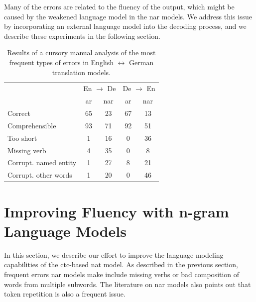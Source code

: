Many of the errors are related to the fluency of the output, which might be
caused by the weakened language model in the \ac{nar} models. We address this
issue by incorporating an external language model into the decoding process,
and we describe these experiments in the following section.

\begin{table}
  \centering
  \begin{tabular}{lcccc}
    \toprule
    & \multicolumn{2}{c}{En $\rightarrow$ De} & \multicolumn{2}{c}{De $\rightarrow$ En} \\
    & \acs{ar} & \acs{nar} & \acs{ar} & \acs{nar} \\
    \midrule
    Correct        & 65 & 23 & 67 & 13 \\
    Comprehensible & 93 & 71 & 92 & 51 \\
    \midrule
    Too short      & 1 & 16 & 0 & 36 \\
    Missing verb   & 4 & 35 & 0 & 8 \\
    Corrupt. named entity   & 1 & 27 & 8 & 21 \\
    Corrupt. other words & 1 & 20 & 0 & 46 \\
    \bottomrule
  \end{tabular}

  \caption{Results of a cursory manual analysis of the most frequent types of
    errors in English $\leftrightarrow$ German translation models.}%
  \label{tab:end-to-end:error-analysis}

\end{table}



\section{Improving Fluency with n-gram Language Models}%
\label{sec:ctc:fluency}


\noindent
In this section, we describe our effort to improve the language modeling
capabilities of the \acs{ctc}-based \ac{nat} model. As described in the
previous section, frequent errors \acl{nar} models make include missing verbs
or bad composition of words from multiple subwords. The literature on \ac{nar}
models also points out that token repetition is also a frequent issue. 

